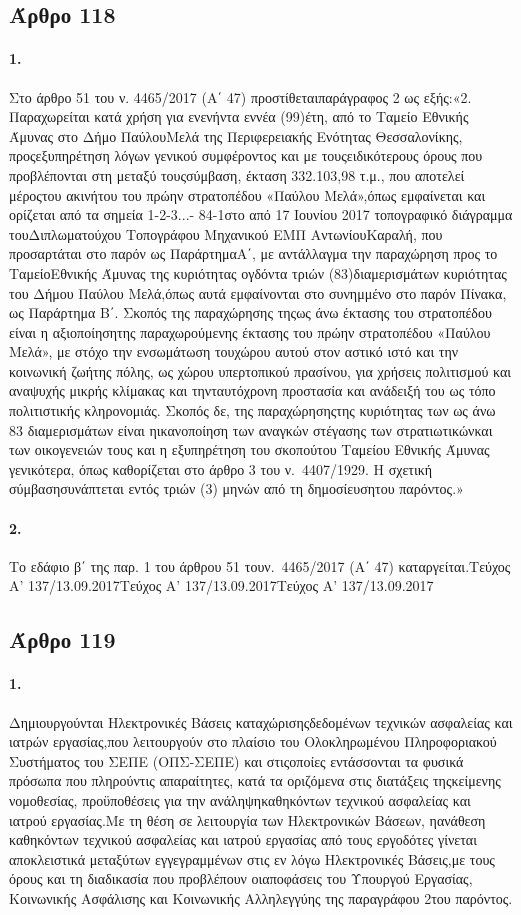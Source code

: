 \documentclass[a4paper,oneside, 10pt]{book}
\begin{document}
\subsection*{ Άρθρο 118 }
\paragraph { 1. } Στο άρθρο 51 του ν. 4465/2017 (Α΄ 47) προστίθεταιπαράγραφος 2 ως εξής:«2. Παραχωρείται κατά χρήση για ενενήντα εννέα (99)έτη, από το Ταμείο Εθνικής Άμυνας στο Δήμο ΠαύλουΜελά της Περιφερειακής Ενότητας Θεσσαλονίκης, προςεξυπηρέτηση λόγων γενικού συμφέροντος και με τουςειδικότερους όρους που προβλέπονται στη μεταξύ τουςσύμβαση, έκταση 332.103,98 τ.μ., που αποτελεί μέροςτου ακινήτου του πρώην στρατοπέδου «Παύλου Μελά»,όπως εμφαίνεται και ορίζεται από τα σημεία 1-2-3...- 84-1στο από 17 Ιουνίου 2017 τοπογραφικό διάγραμμα τουΔιπλωματούχου Τοπογράφου Μηχανικού ΕΜΠ ΑντωνίουΚαραλή, που προσαρτάται στο παρόν ως ΠαράρτημαΑ΄, με αντάλλαγμα την παραχώρηση προς το ΤαμείοΕθνικής Άμυνας της κυριότητας ογδόντα τριών (83)διαμερισμάτων κυριότητας του Δήμου Παύλου Μελά,όπως αυτά εμφαίνονται στο συνημμένο στο παρόν Πίνακα, ως Παράρτημα Β΄. Σκοπός της παραχώρησης τηςως άνω έκτασης του στρατοπέδου είναι η αξιοποίησητης παραχωρούμενης έκτασης του πρώην στρατοπέδου «Παύλου Μελά», με στόχο την ενσωμάτωση τουχώρου αυτού στον αστικό ιστό και την κοινωνική ζωήτης πόλης, ως χώρου υπερτοπικού πρασίνου, για χρήσεις πολιτισμού και αναψυχής μικρής κλίμακας και τηνταυτόχρονη προστασία και ανάδειξή του ως τόπο πολιτιστικής κληρονομιάς. Σκοπός δε, της παραχώρησηςτης κυριότητας των ως άνω 83 διαμερισμάτων είναι ηικανοποίηση των αναγκών στέγασης των στρατιωτικώνκαι των οικογενειών τους και η εξυπηρέτηση του σκοπούτου Ταμείου Εθνικής Άμυνας γενικότερα, όπως καθορίζεται στο άρθρο 3 του ν. 4407/1929. Η σχετική σύμβασησυνάπτεται εντός τριών (3) μηνών από τη δημοσίευσητου παρόντος.»
\paragraph { 2. } Το εδάφιο β΄ της παρ. 1 του άρθρου 51 τουν. 4465/2017 (Α΄ 47) καταργείται.Τεύχος Α’ 137/13.09.2017Τεύχος Α’ 137/13.09.2017Τεύχος Α’ 137/13.09.2017
\subsection*{ Άρθρο 119 }
\paragraph { 1. } Δημιουργούνται Ηλεκτρονικές Βάσεις καταχώρισηςδεδομένων τεχνικών ασφαλείας και ιατρών εργασίας,που λειτουργούν στο πλαίσιο του Ολοκληρωμένου Πληροφοριακού Συστήματος του ΣΕΠΕ (ΟΠΣ-ΣΕΠΕ) και στιςοποίες εντάσσονται τα φυσικά πρόσωπα που πληρούντις απαραίτητες, κατά τα οριζόμενα στις διατάξεις τηςκείμενης νομοθεσίας, προϋποθέσεις για την ανάληψηκαθηκόντων τεχνικού ασφαλείας και ιατρού εργασίας.Με τη θέση σε λειτουργία των Ηλεκτρονικών Βάσεων, ηανάθεση καθηκόντων τεχνικού ασφαλείας και ιατρού εργασίας από τους εργοδότες γίνεται αποκλειστικά μεταξύτων εγγεγραμμένων στις εν λόγω Ηλεκτρονικές Βάσεις,με τους όρους και τη διαδικασία που προβλέπουν οιαποφάσεις του Υπουργού Εργασίας, Κοινωνικής Ασφάλισης και Κοινωνικής Αλληλεγγύης της παραγράφου 2του παρόντος.
\end{document}
